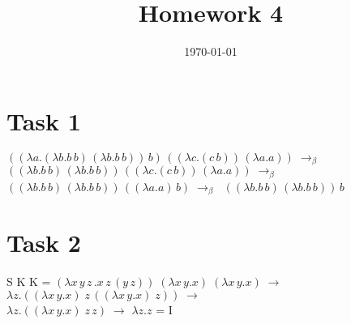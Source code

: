 \documentclass{article}
\title{Homework 4}
\date{\today}
\begin{document}
	
\maketitle

\section*{Task 1}
$((\lambda a.(\lambda b.b\,b)\,(\lambda b.b\,b))\,b)\,((\lambda c.(c\,b))\,(\lambda a.a))\; \to_\beta \;$
$((\lambda b.b\,b)\,(\lambda b.b\,b))\,((\lambda c.(c\,b))\,(\lambda a.a))\; \to_\beta \;$ \\
$((\lambda b.b\,b)\,(\lambda b.b\,b))\,((\lambda a.a)\,b)\; \to_\beta \;$
$((\lambda b.b\,b)\,(\lambda b.b\,b))\,b$

\section*{Task 2}
S K K = 
$(\lambda x\,y\,z\,.x\,z\,(y\,z))\;(\lambda x\,y.x)\;(\lambda x\,y.x)\; \to$
$\lambda z.((\lambda x\,y.x)\;z\,((\lambda x\,y.x)\;z))\; \to$ \\
$\lambda z.((\lambda x\,y.x)\;z\,z)\; \to$
$\lambda z.z$
= I
	
\end{document}
